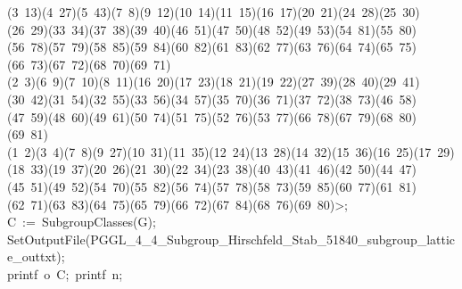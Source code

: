 \begin{tabbing}
(3\ 13)(4\ 27)(5\ 43)(7\ 8)(9\ 12)(10\ 14)(11\ 15)(16\ 17)(20\ 21)(24\ 28)(25\ 30)(26\ 29)(33\ 34)(37\ 38)(39\ 40)(46\ 51)(47\ 50)(48\ 52)(49\ 53)(54\ 81)(55\ 80)(56\ 78)(57\ 79)(58\ 85)(59\ 84)(60\ 82)(61\ 83)(62\ 77)(63\ 76)(64\ 74)(65\ 75)(66\ 73)(67\ 72)(68\ 70)(69\ 71)\ \\[0pt]
(2\ 3)(6\ 9)(7\ 10)(8\ 11)(16\ 20)(17\ 23)(18\ 21)(19\ 22)(27\ 39)(28\ 40)(29\ 41)(30\ 42)(31\ 54)(32\ 55)(33\ 56)(34\ 57)(35\ 70)(36\ 71)(37\ 72)(38\ 73)(46\ 58)(47\ 59)(48\ 60)(49\ 61)(50\ 74)(51\ 75)(52\ 76)(53\ 77)(66\ 78)(67\ 79)(68\ 80)(69\ 81)\ \\[0pt]
(1\ 2)(3\ 4)(7\ 8)(9\ 27)(10\ 31)(11\ 35)(12\ 24)(13\ 28)(14\ 32)(15\ 36)(16\ 25)(17\ 29)(18\ 33)(19\ 37)(20\ 26)(21\ 30)(22\ 34)(23\ 38)(40\ 43)(41\ 46)(42\ 50)(44\ 47)(45\ 51)(49\ 52)(54\ 70)(55\ 82)(56\ 74)(57\ 78)(58\ 73)(59\ 85)(60\ 77)(61\ 81)(62\ 71)(63\ 83)(64\ 75)(65\ 79)(66\ 72)(67\ 84)(68\ 76)(69\ 80){\textgreater};\\[0pt]
C\ :=\ SubgroupClasses(G);\\[0pt]
SetOutputFile(PGGL\_4\_4\_Subgroup\_Hirschfeld\_Stab\_51840\_subgroup\_lattice\_outtxt);\\[0pt]
printf\ o\ C;\ printf\ n;\\[0pt]

\end{tabbing}
